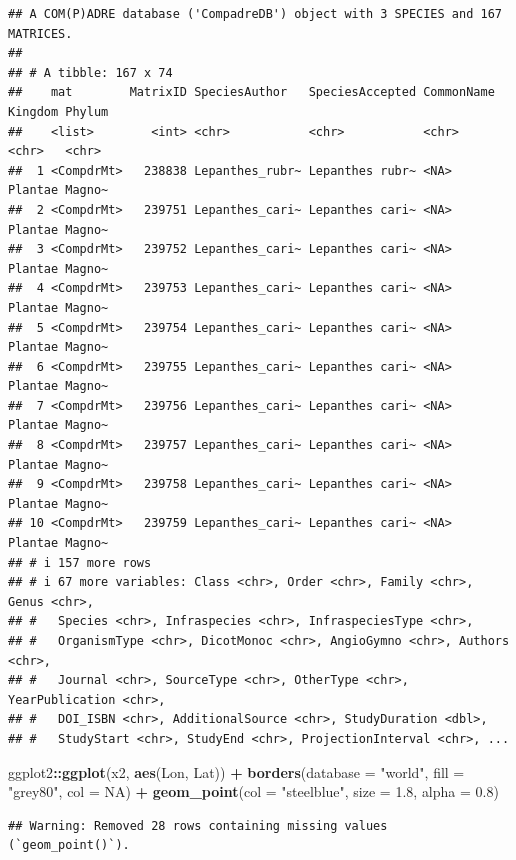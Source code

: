 \documentclass[
]{book}
\newenvironment{Shaded}{\begin{snugshade}}{\end{snugshade}}
\newcommand{\AttributeTok}[1]{\textcolor[rgb]{0.13,0.29,0.53}{#1}}
\newcommand{\ConstantTok}[1]{\textcolor[rgb]{0.56,0.35,0.01}{#1}}
\newcommand{\FloatTok}[1]{\textcolor[rgb]{0.00,0.00,0.81}{#1}}
\newcommand{\FunctionTok}[1]{\textcolor[rgb]{0.13,0.29,0.53}{\textbf{#1}}}
\newcommand{\NormalTok}[1]{#1}
\newcommand{\SpecialCharTok}[1]{\textcolor[rgb]{0.81,0.36,0.00}{\textbf{#1}}}
\newcommand{\StringTok}[1]{\textcolor[rgb]{0.31,0.60,0.02}{#1}}
\theoremstyle{definition}
\theoremstyle{definition}
\theoremstyle{definition}
\theoremstyle{definition}
\theoremstyle{remark}
\begin{document}
\begin{verbatim}
## A COM(P)ADRE database ('CompadreDB') object with 3 SPECIES and 167 MATRICES.
## 
## # A tibble: 167 x 74
##    mat        MatrixID SpeciesAuthor   SpeciesAccepted CommonName Kingdom Phylum
##    <list>        <int> <chr>           <chr>           <chr>      <chr>   <chr> 
##  1 <CompdrMt>   238838 Lepanthes_rubr~ Lepanthes rubr~ <NA>       Plantae Magno~
##  2 <CompdrMt>   239751 Lepanthes_cari~ Lepanthes cari~ <NA>       Plantae Magno~
##  3 <CompdrMt>   239752 Lepanthes_cari~ Lepanthes cari~ <NA>       Plantae Magno~
##  4 <CompdrMt>   239753 Lepanthes_cari~ Lepanthes cari~ <NA>       Plantae Magno~
##  5 <CompdrMt>   239754 Lepanthes_cari~ Lepanthes cari~ <NA>       Plantae Magno~
##  6 <CompdrMt>   239755 Lepanthes_cari~ Lepanthes cari~ <NA>       Plantae Magno~
##  7 <CompdrMt>   239756 Lepanthes_cari~ Lepanthes cari~ <NA>       Plantae Magno~
##  8 <CompdrMt>   239757 Lepanthes_cari~ Lepanthes cari~ <NA>       Plantae Magno~
##  9 <CompdrMt>   239758 Lepanthes_cari~ Lepanthes cari~ <NA>       Plantae Magno~
## 10 <CompdrMt>   239759 Lepanthes_cari~ Lepanthes cari~ <NA>       Plantae Magno~
## # i 157 more rows
## # i 67 more variables: Class <chr>, Order <chr>, Family <chr>, Genus <chr>,
## #   Species <chr>, Infraspecies <chr>, InfraspeciesType <chr>,
## #   OrganismType <chr>, DicotMonoc <chr>, AngioGymno <chr>, Authors <chr>,
## #   Journal <chr>, SourceType <chr>, OtherType <chr>, YearPublication <chr>,
## #   DOI_ISBN <chr>, AdditionalSource <chr>, StudyDuration <dbl>,
## #   StudyStart <chr>, StudyEnd <chr>, ProjectionInterval <chr>, ...
\end{verbatim}

\begin{Shaded}
\begin{Highlighting}[]
\NormalTok{ggplot2}\SpecialCharTok{::}\FunctionTok{ggplot}\NormalTok{(x2, }\FunctionTok{aes}\NormalTok{(Lon, Lat)) }\SpecialCharTok{+}
  \FunctionTok{borders}\NormalTok{(}\AttributeTok{database =} \StringTok{"world"}\NormalTok{, }\AttributeTok{fill =} \StringTok{"grey80"}\NormalTok{, }\AttributeTok{col =} \ConstantTok{NA}\NormalTok{) }\SpecialCharTok{+}
  \FunctionTok{geom\_point}\NormalTok{(}\AttributeTok{col =} \StringTok{"steelblue"}\NormalTok{, }\AttributeTok{size =} \FloatTok{1.8}\NormalTok{, }\AttributeTok{alpha =} \FloatTok{0.8}\NormalTok{)}
\end{Highlighting}
\end{Shaded}

\begin{verbatim}
## Warning: Removed 28 rows containing missing values (`geom_point()`).
\end{verbatim}
\end{document}
